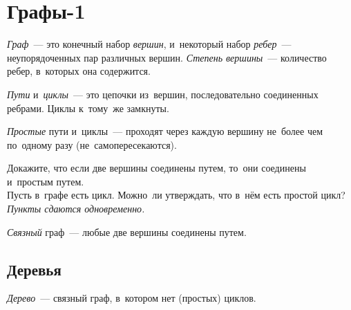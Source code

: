 
\section*{Графы-1}



\emph{Граф}~--- это конечный набор \emph{вершин}, и~некоторый набор
\emph{ребер}~--- неупорядоченных пар различных вершин.
\emph{Степень вершины}~--- количество ребер, в~которых она содержится.

\emph{Пути} и~\emph{циклы}~--- это цепочки из~вершин, последовательно
соединенных ребрами.
Циклы к~тому~же замкнуты.

\emph{Простые} пути и~циклы~--- проходят через каждую вершину не~более чем
по~одному разу (не~самопересекаются).

\begin{problems}

\item
\sp
Докажите, что если две вершины соединены путем, то~они соединены и~простым
путем.
\\
\sp
Пусть в~графе есть цикл.
Можно~ли утверждать, что в~нём есть простой цикл?
\\
\emph{Пункты сдаются одновременно.}

\end{problems}

\emph{Связный} граф~--- любые две вершины соединены путем.

\subsection*{Деревья}

\emph{Дерево}~--- связный граф, в~котором нет (простых) циклов.

